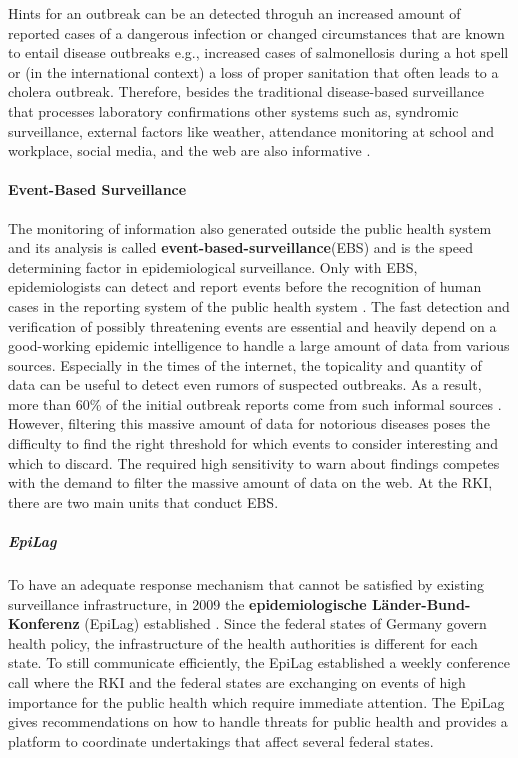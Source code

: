Hints for an outbreak can be an detected throguh an increased amount of reported cases of a dangerous infection or changed circumstances that are known to entail disease outbreaks e.g., increased cases of salmonellosis during a hot spell or (in the international context) a loss of proper sanitation that often leads to a cholera outbreak.
Therefore, besides the traditional disease-based surveillance that processes laboratory confirmations other systems such as, syndromic surveillance, external factors like weather, attendance monitoring at school and workplace, social media, and the web are also informative \citep{EarlyDetection}.

\paragraph{Event-Based Surveillance}
The monitoring of information also generated outside the public health system and its analysis is called \textbf{event-based-surveillance}(\gls{EBS}) and is the speed determining factor in epidemiological surveillance.
Only with EBS, epidemiologists can detect and report events before the recognition of human cases in the reporting system of the public health system \citep{EarlyDetection}.
The fast detection and verification of possibly threatening events are essential and heavily depend on a good-working epidemic intelligence to handle a large amount of data from various sources.
Especially in the times of the internet, the topicality and quantity of data can be useful to detect even rumors of suspected outbreaks.
As a result, more than 60\% of the initial outbreak reports come from such informal sources \citep{EpiSurv}.
However, filtering this massive amount of data for notorious diseases poses the difficulty to find the right threshold for which events to consider interesting and which to discard.
The required high sensitivity to warn about findings competes with the demand to filter the massive amount of data on the web.
At the RKI, there are two main units that conduct EBS.

\subparagraph{EpiLag}
To have an adequate response mechanism that cannot be satisfied by existing surveillance infrastructure, in 2009 the \textbf{epidemiologische L\"ander-Bund-Konferenz} (\gls{EpiLag})  established \citep{Mohr2010}.
Since the federal states of Germany govern health policy, the infrastructure of the health authorities is different for each state.
To still communicate efficiently, the EpiLag established a weekly conference call where the RKI and the federal states are exchanging on events of high importance for the public health which require immediate attention.
The EpiLag gives recommendations on how to handle threats for public health and provides a platform to coordinate undertakings that affect several federal states.

